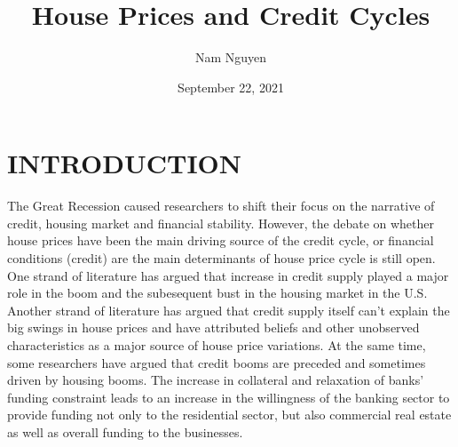 \documentclass[
  12pt,
]{article}
\title{House Prices and Credit Cycles}
\author{Nam Nguyen}
\date{September 22, 2021}
\begin{document}
\maketitle

\hypertarget{introduction}{%
\section{INTRODUCTION}\label{introduction}}

The Great Recession caused researchers to shift their focus on the narrative of credit, housing market and financial stability. However, the debate on whether house prices have been the main driving source of the credit cycle, or financial conditions (credit) are the main determinants of house price cycle is still open. One strand of literature has argued that increase in credit supply played a major role in the boom and the subesequent bust in the housing market in the U.S. Another strand of literature has argued that credit supply itself can't explain the big swings in house prices and have attributed beliefs and other unobserved characteristics as a major source of house price variations. At the same time, some researchers have argued that credit booms are preceded and sometimes driven by housing booms. The increase in collateral and relaxation of banks' funding constraint leads to an increase in the willingness of the banking sector to provide funding not only to the residential sector, but also commercial real estate as well as overall funding to the businesses. 
\end{document}
